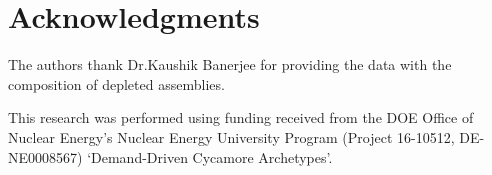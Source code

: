 \section{Acknowledgments}
The authors thank Dr.Kaushik Banerjee for providing the data with the
composition of depleted assemblies.

This research was performed using funding received from the DOE Office of Nuclear Energy's
Nuclear Energy University Program (Project 16-10512, DE-NE0008567) `Demand-Driven Cycamore Archetypes'.